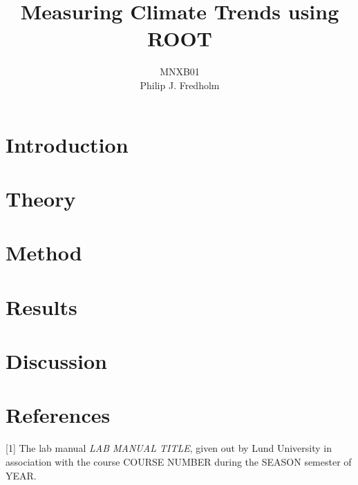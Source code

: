 \documentclass[a4, 12pt]{article}
\title{Measuring Climate Trends using ROOT}
\author{MNXB01 \\ Philip J. Fredholm \\ }
\begin{document}
\maketitle
\tableofcontents
\newpage

\section{Introduction}
\section{Theory}
\section{Method}
\section{Results}
\section{Discussion}
\section{References}
[1] The lab manual \textit{LAB MANUAL TITLE}, given out by Lund University in association with the course COURSE NUMBER during the SEASON semester of YEAR. \newline \newline
\noindent 
\end{document}
